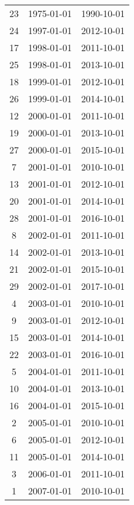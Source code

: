 % 
\begin{tabular}{ccc}
  \hline
  \hline
23 & 1975-01-01 & 1990-10-01 \\ 
  24 & 1997-01-01 & 2012-10-01 \\ 
  17 & 1998-01-01 & 2011-10-01 \\ 
  25 & 1998-01-01 & 2013-10-01 \\ 
  18 & 1999-01-01 & 2012-10-01 \\ 
  26 & 1999-01-01 & 2014-10-01 \\ 
  12 & 2000-01-01 & 2011-10-01 \\ 
  19 & 2000-01-01 & 2013-10-01 \\ 
  27 & 2000-01-01 & 2015-10-01 \\ 
  7 & 2001-01-01 & 2010-10-01 \\ 
  13 & 2001-01-01 & 2012-10-01 \\ 
  20 & 2001-01-01 & 2014-10-01 \\ 
  28 & 2001-01-01 & 2016-10-01 \\ 
  8 & 2002-01-01 & 2011-10-01 \\ 
  14 & 2002-01-01 & 2013-10-01 \\ 
  21 & 2002-01-01 & 2015-10-01 \\ 
  29 & 2002-01-01 & 2017-10-01 \\ 
  4 & 2003-01-01 & 2010-10-01 \\ 
  9 & 2003-01-01 & 2012-10-01 \\ 
  15 & 2003-01-01 & 2014-10-01 \\ 
  22 & 2003-01-01 & 2016-10-01 \\ 
  5 & 2004-01-01 & 2011-10-01 \\ 
  10 & 2004-01-01 & 2013-10-01 \\ 
  16 & 2004-01-01 & 2015-10-01 \\ 
  2 & 2005-01-01 & 2010-10-01 \\ 
  6 & 2005-01-01 & 2012-10-01 \\ 
  11 & 2005-01-01 & 2014-10-01 \\ 
  3 & 2006-01-01 & 2011-10-01 \\ 
  1 & 2007-01-01 & 2010-10-01 \\ 
   \hline
\end{tabular}
